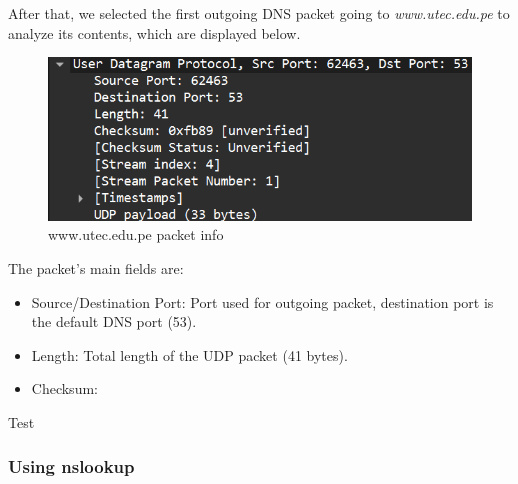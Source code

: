 After that, we selected the first outgoing DNS packet going to
\textit{www.utec.edu.pe} to analyze its contents, which are displayed below.

\begin{figure}[htbp]
    \centering
    \includegraphics[width=1\linewidth]{img/4.png}
    \caption{www.utec.edu.pe packet info}\label{fig:4}
\end{figure}

The packet's main fields are:

\begin{itemize}
    \item Source/Destination Port: Port used for outgoing packet, destination port is the
          default DNS port (53).
    \item Length: Total length of the UDP packet (41 bytes).
    \item Checksum:
\end{itemize}

Test\cite{tanenbaum:networks}

\subsubsection{Using nslookup}

